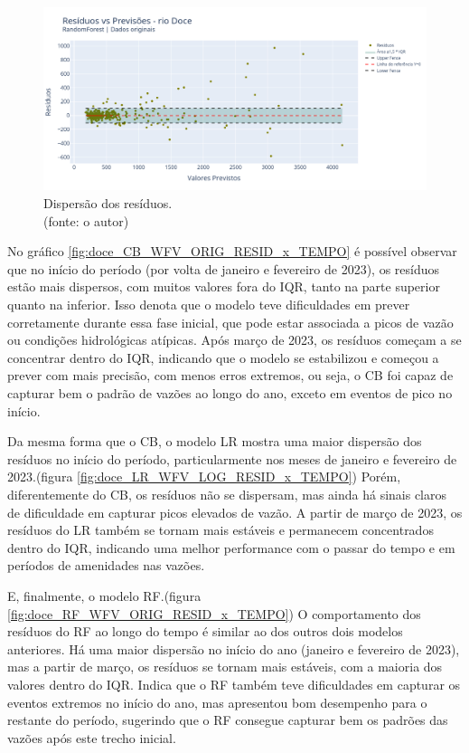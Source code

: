 \begin{figure}[!h]
\centering
\includegraphics[scale=0.33]{Figuras/rio_doce/wfv/RF/RF_WFV_ORIG_RESID_x_PREV.png}
\caption{Dispersão dos resíduos.\\(fonte: o autor)}
\label{fig:doce_RF_WFV_ORIG_RESID_x_PREV}
\end{figure}
\clearpage

No gráfico \ref{fig:doce_CB_WFV_ORIG_RESID_x_TEMPO} é possível observar que no início do período (por volta de janeiro e fevereiro de 2023), os resíduos estão mais dispersos, com muitos valores fora do IQR, tanto na parte superior quanto na inferior. Isso denota que o modelo teve dificuldades em prever corretamente durante essa fase inicial, que pode estar associada a picos de vazão ou condições hidrológicas atípicas. Após março de 2023, os resíduos começam a se concentrar dentro do IQR, indicando que o modelo se estabilizou e começou a prever com mais precisão, com menos erros extremos, ou seja, o CB foi capaz de capturar bem o padrão de vazões ao longo do ano, exceto em eventos de pico no início.

Da mesma forma que o CB, o modelo LR mostra uma maior dispersão dos resíduos no início do período, particularmente nos meses de janeiro e fevereiro de 2023.(figura \ref{fig:doce_LR_WFV_LOG_RESID_x_TEMPO}) Porém, diferentemente do CB, os resíduos não se dispersam, mas ainda há sinais claros de dificuldade em capturar picos elevados de vazão. A partir de março de 2023, os resíduos do LR também se tornam mais estáveis e permanecem concentrados dentro do IQR, indicando uma melhor performance com o passar do tempo e em períodos de amenidades nas vazões.

E, finalmente, o modelo RF.(figura \ref{fig:doce_RF_WFV_ORIG_RESID_x_TEMPO}) O comportamento dos resíduos do RF ao longo do tempo é similar ao dos outros dois modelos anteriores. Há uma maior dispersão no início do ano (janeiro e fevereiro de 2023), mas a partir de março, os resíduos se tornam mais estáveis, com a maioria dos valores dentro do IQR. Indica que o RF também teve dificuldades em capturar os eventos extremos no início do ano, mas apresentou bom desempenho para o restante do período, sugerindo que o RF consegue capturar bem os padrões das vazões após este trecho inicial.

